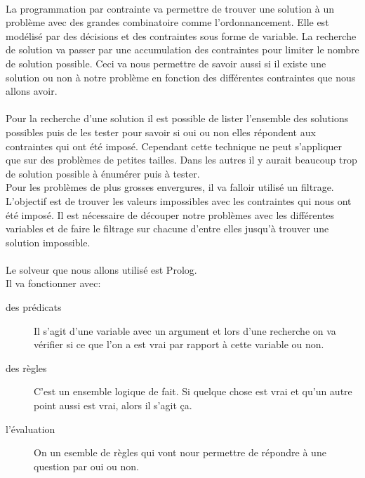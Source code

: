 \documentclass[12pt]{article}
\begin{document}
			\paragraph{}
				La programmation par contrainte va permettre de trouver une solution à un problème avec des grandes combinatoire comme l'ordonnancement. Elle est modélisé par des décisions et des contraintes sous forme de variable. La recherche de solution va passer par une accumulation des contraintes pour limiter le nombre de solution possible. Ceci va nous permettre de savoir aussi si il existe une solution ou non à notre problème en fonction des différentes contraintes que nous allons avoir.
			
			\paragraph{}
				Pour la recherche d'une solution il est possible de lister l'ensemble des solutions possibles puis de les tester pour savoir si oui ou non elles répondent aux contraintes qui ont été imposé. Cependant cette technique ne peut s'appliquer que sur des problèmes de petites tailles. Dans les autres il y aurait beaucoup trop de solution possible à énumérer puis à tester.\\
Pour les problèmes de plus grosses envergures, il va falloir utilisé un filtrage. L'objectif est de trouver les valeurs impossibles avec les contraintes qui nous ont été imposé. Il est nécessaire de découper notre problèmes avec les différentes variables et de faire le filtrage sur chacune d'entre elles jusqu'à trouver une solution impossible.

			\paragraph{}
				Le solveur que nous allons utilisé est Prolog. \\ Il va fonctionner avec:

				\begin{description}

					\item [des prédicats] Il s'agit d'une variable avec un argument et lors d'une recherche on va vérifier si ce que l'on a est vrai par rapport à cette variable ou non.
					\item [des règles] C'est un ensemble logique de fait. Si quelque chose est vrai et qu'un autre point aussi est vrai, alors il s'agit ça.
					\item [l'évaluation] On un esemble de règles qui vont nour permettre de répondre à une question par oui ou non.

				\end{description}
\end{document}
